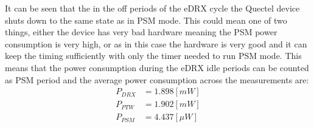 It can be seen that the in the off periods of the eDRX cycle the Quectel device shuts down to the same state as in PSM mode. This could  mean one of two things, either the device has very bad hardware meaning the PSM power consumption is very high, or as in this case the hardware is very good and it can keep the timing sufficiently with only the timer needed to run PSM mode. This means that the power consumption during the eDRX idle periods can be counted as PSM period and the average power consumption across the measurements are:
\begin{align}
P_{DRX} &= 1.898 [mW]\\
P_{PTW} &= 1.902 [mW] \\
P_{PSM} &= 4.437 [\mu W]
\end{align}



